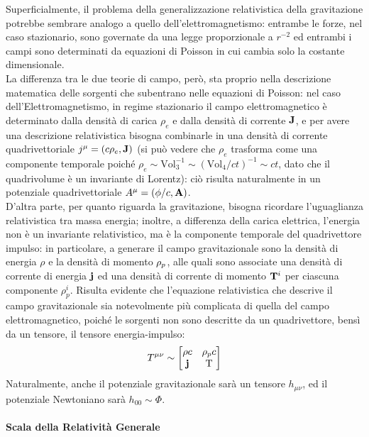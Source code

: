 Superficialmente, il problema della generalizzazione relativistica della gravitazione potrebbe sembrare analogo a quello dell'elettromagnetismo: entrambe le forze, nel caso stazionario, sono governate da una legge proporzionale a $ r^{-2} $ ed entrambi i campi sono determinati da equazioni di Poisson in cui cambia solo la costante dimensionale.\\
La differenza tra le due teorie di campo, però, sta proprio nella descrizione matematica delle sorgenti che subentrano nelle equazioni di Poisson: nel caso dell'Elettromagnetismo, in regime stazionario il campo elettromagnetico è determinato dalla densità di carica $ \rho_e $ e dalla densità di corrente $ \mathbf{J} $, e per avere una descrizione relativistica bisogna combinarle in una densità di corrente quadrivettoriale $ j^{\mu} = \left( c\rho_e,\mathbf{J} \right)$ (si può vedere che $ \rho_e $ trasforma come una componente temporale poiché $ \rho_e \sim \text{Vol}_3^{-1} \sim \left( \text{Vol}_4 / ct \right)^{-1} \sim ct $, dato che il quadrivolume è un invariante di Lorentz): ciò risulta naturalmente in un potenziale quadrivettoriale $ A^{\mu} = \left( \phi/c, \mathbf{A} \right) $.\\
D'altra parte, per quanto riguarda la gravitazione, bisogna ricordare l'uguaglianza relativistica tra massa energia; inoltre, a differenza della carica elettrica, l'energia non è un invariante relativistico, ma è la componente temporale del quadrivettore impulso: in particolare, a generare il campo gravitazionale sono la densità di energia $ \rho $ e la densità di momento $ \mathbf{\rho}_p $, alle quali sono associate una densità di corrente di energia $ \mathbf{j} $ ed una densità di corrente di momento $ \mathbf{T}^i $ per ciascuna componente $ \rho_p^i $. Risulta evidente che l'equazione relativistica che descrive il campo gravitazionale sia notevolmente più complicata di quella del campo elettromagnetico, poiché le sorgenti non sono descritte da un quadrivettore, bensì da un tensore, il tensore energia-impulso:
\begin{equation}
  T^{\mu \nu} \sim
  \begin{bmatrix}
    \rho c & \mathbf{\rho}_p c \\
    \mathbf{j} & \mathbf{\text{T}}
  \end{bmatrix}
  \label{eq:0.2}
\end{equation}
Naturalmente, anche il potenziale gravitazionale sarà un tensore $ h_{\mu \nu} $, ed il potenziale Newtoniano sarà $ h_{00} \sim \Phi $.

\paragraph{Scala della Relatività Generale}

